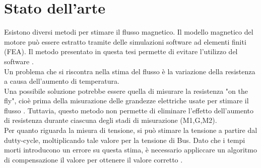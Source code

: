 \section{Stato dell'arte}
Esistono diversi metodi per stimare il flusso magnetico. Il modello magnetico del motore può essere estratto tramite delle simulazioni software ad elementi finiti (FEA).
Il metodo presentato in questa tesi permette di evitare l'utilizzo del software \cite{Zhao-Hong}.\\
Un problema che si riscontra nella stima del flusso è la variazione della resistenza a causa dell'aumento di temperatura.\\
Una possibile soluzione potrebbe essere quella di misurare la resistenza "on the fly", cioè prima della misurazione delle grandezze elettriche usate per stimare il flusso \cite{Gierczynski}. Tuttavia, questo metodo non permette di eliminare l'effetto dell'aumento di resistenza durante ciascuna degli stadi di misurazione (M1,G,M2).\\
Per quanto riguarda la misura di tensione, si può stimare la tensione a partire dal dutty-cycle, moltiplicando tale valore per la tensione di Bus. Dato che i tempi morti introducono un errore su questa stima, è necessario appliccare un algoritmo di compensazione il valore per ottenere il valore corretto \cite{Gierczynski}.

